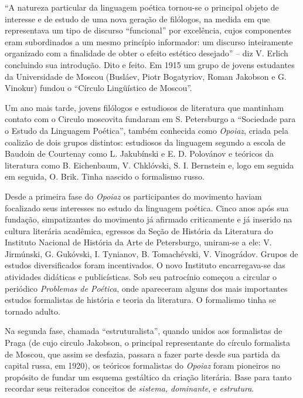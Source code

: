 ``A natureza particular da linguagem poética tornou-se o principal
objeto de interesse e de estudo de uma nova geração de filólogos, na
medida em que representava um tipo de discurso ``funcional'' por
excelência, cujos componentes eram subordinados a um mesmo princípio
informador: um discurso inteiramente organizado com a finalidade de
obter o efeito estético desejado'' -- diz V. Erlich concluindo sua
introdução. Dito e feito. Em 1915 um grupo de jovens estudantes da
Universidade de Moscou (Busláev, Piotr Bogatyriov, Roman Jakobson e G.
Vinokur) fundou o ``Círculo Lingüístico de Moscou''.

Um ano mais tarde, jovens filólogos e estudiosos de literatura que
mantinham contato com o Circulo moscovita fundaram em S. Petersburgo a
``Sociedade para o Estudo da Linguagem Poética'', também conhecida como
\emph{Opoiaz}, criada pela coalizão de dois grupos distintos: estudiosos
da linguagem segundo a escola de Baudoin de Courtenay como L. Jakubínski
e E. D. Polovánov e teóricos da literatura como B. Eichenbaum, V.
Chklóvski, S. I. Bernstein e, logo em seguida em seguida, O. Brik. Tinha
nascido o formalismo russo.

Desde a primeira fase do \emph{Opoiaz} os participantes do movimento
haviam focalizado seus interesses no estudo da linguagem poética. Cinco
anos após sua fundação, simpatizantes do movimento já afirmado
criticamente e já inserido na cultura literária acadêmica, egressos da
Seção de História da Literatura do Instituto Nacional de História da
Arte de Petersburgo, uniram-se a ele: V. Jirmúnski, G. Gukóvski, I.
Tynianov, B. Tomachévski, V. Vinográdov. Grupos de estudos
diversificados foram incentivados. O novo Instituto encarregava-se das
atividades didáticas e publicísticas. Sob seu patrocínio começou a
circular o periódico \emph{Problemas de Poética}, onde apareceram alguns
dos mais importantes estudos formalistas de história e teoria da
literatura. O formalismo tinha se tornado adulto.

Na segunda fase, chamada ``estruturalista'', quando unidos aos
formalistas de Praga (de cujo circulo Jakobson, o principal
representante do círculo formalista de Moscou, que assim se desfazia,
passara a fazer parte desde sua partida da capital russa, em 1920), os
teóricos formalistas do \emph{Opoiaz} foram pioneiros no propósito de
fundar um esquema gestáltico da criação literária. Base para tanto
recordar seus reiterados conceitos de \emph{sistema, dominante}, e
\emph{estrutura}.

